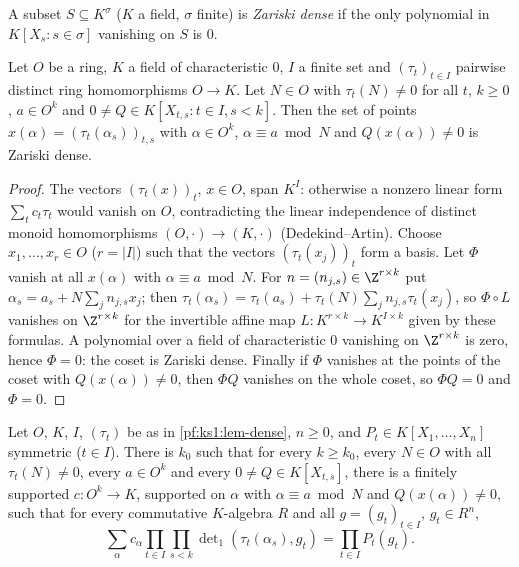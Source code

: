 A subset $S\subseteq K^\sigma$ ($K$ a field, $\sigma$ finite) is \emph{Zariski dense} if the only polynomial in $K[X_s:s\in\sigma]$
vanishing on $S$ is $0$.

\begin{lemma}\label{pf:ks1:lem-dense}
Let $O$ be a ring, $K$ a field of characteristic $0$, $I$ a finite set and $(\tau_t)_{t\in I}$ pairwise distinct ring homomorphisms
$O\to K$. Let $N\in O$ with $\tau_t(N)\neq0$ for all $t$, $k\ge0$, $a\in O^k$ and $0\neq Q\in K[X_{t,s}:t\in I,s<k]$. Then the set of
points $x(\alpha)=(\tau_t(\alpha_s))_{t,s}$ with $\alpha\in O^k$, $\alpha\equiv a\bmod N$ and $Q(x(\alpha))\neq0$ is Zariski dense.
\end{lemma}

\begin{proof}
The vectors $(\tau_t(x))_t$, $x\in O$, span $K^I$: otherwise a nonzero linear form $\sum_tc_t\tau_t$ would vanish on $O$, contradicting the
linear independence of distinct monoid homomorphisms $(O,\cdot)\to(K,\cdot)$ (Dedekind--Artin). Choose $x_1,\dots,x_r\in O$
($r=|I|$) such that the vectors $(\tau_t(x_j))_t$ form a basis. Let $\Phi$ vanish at all $x(\alpha)$ with $\alpha\equiv a\bmod N$. For
$n=(n_{j,s})\in\Z^{r\times k}$ put $\alpha_s=a_s+N\sum_jn_{j,s}x_j$; then $\tau_t(\alpha_s)=\tau_t(a_s)+\tau_t(N)\sum_jn_{j,s}\tau_t(x_j)$, so
$\Phi\circ L$ vanishes on $\Z^{r\times k}$ for the invertible affine map $L:K^{r\times k}\to K^{I\times k}$ given by these formulas. A polynomial
over a field of characteristic $0$ vanishing on $\Z^{r\times k}$ is zero, hence $\Phi=0$: the coset is Zariski dense. Finally if $\Phi$
vanishes at the points of the coset with $Q(x(\alpha))\neq0$, then $\Phi Q$ vanishes on the whole coset, so $\Phi Q=0$ and $\Phi=0$.
\end{proof}

\begin{lemma}[Interpolation]\label{pf:ks1:lem-interp}
Let $O$, $K$, $I$, $(\tau_t)$ be as in \cref{pf:ks1:lem-dense}, $n\ge0$, and $P_t\in K[X_1,\dots,X_n]$ symmetric ($t\in I$). There is $k_0$
such that for every $k\ge k_0$, every $N\in O$ with all $\tau_t(N)\neq0$, every $a\in O^k$ and every $0\neq Q\in K[X_{t,s}]$, there is a
finitely supported $c:O^k\to K$, supported on $\alpha$ with $\alpha\equiv a\bmod N$ and $Q(x(\alpha))\neq0$, such that for every commutative
$K$-algebra $R$ and all $g=(g_t)_{t\in I}$, $g_t\in R^n$,
\begin{equation}\label{pf:ks1:eq-interp}
\sum_\alpha c_\alpha\prod_{t\in I}\prod_{s<k}\det\nolimits_1(\tau_t(\alpha_s),g_t)=\prod_{t\in I}P_t(g_t).
\end{equation}
\end{lemma}


